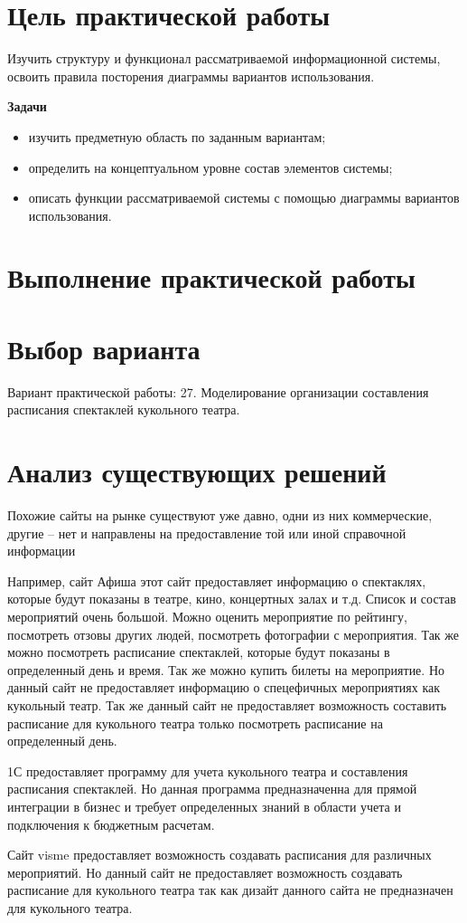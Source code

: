 \section*{\LARGE{Цель практической работы}}
Изучить структуру и функционал рассматриваемой
информационной системы, освоить правила посторения диаграммы вариантов
использования.\par
\textbf{Задачи}
\begin{itemize}
	\item изучить предметную область по заданным вариантам;
	\item определить на концептуальном уровне состав элементов системы;
	\item описать функции рассматриваемой системы с помощью диаграммы вариантов использования.
\end{itemize}
\newpage

\section*{\LARGE{Выполнение практической работы}}

\section{Выбор варианта}
Вариант практической работы: 27. Моделирование организации составления расписания спектаклей
кукольного театра.\par

\section{Анализ существующих решений}
Похожие сайты на рынке существуют уже давно, одни из них коммерческие, другие – нет и  направлены на предоставление
той или иной справочной информации\par
Например, сайт Афиша этот сайт предоставляет информацию о спектаклях, которые будут показаны в театре, кино, концертных
залах и т.д. Список и состав мероприятий очень большой. Можно оценить мероприятие по рейтингу, посмотреть отзовы других
людей, посмотреть фотографии с мероприятия. Так же можно посмотреть расписание спектаклей, которые будут показаны в
определенный день и время. Так же можно купить билеты на мероприятие. Но данный сайт не предоставляет информацию о
спецефичных мероприятиях как кукольный театр. Так же данный сайт не предоставляет возможность составить расписание для
кукольного театра только посмотреть расписание на определенный день.\par
1С предоставляет программу для учета кукольного театра и составления расписания спектаклей. Но данная программа
предназначенна для прямой интеграции в бизнес и требует определенных знаний в области учета и подключения к бюджетным
расчетам.\par
Сайт visme предоставляет возможность создавать расписания для различных мероприятий. Но данный сайт не предоставляет
возможность создавать расписание для кукольного театра так как дизайт данного сайта не предназначен для кукольного
театра.

